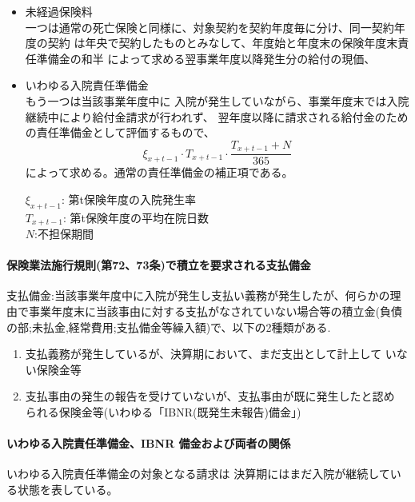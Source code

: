 \documentclass[report,gutter=10mm,fore-edge=10mm,uplatex,dvipdfmx]{jlreq}
\begin{document}
\begin{itemize}
 \item 未経過保険料\\
一つは通常の死亡保険と同様に、対象契約を契約年度毎に分け、同一契約年度の契約
は年央で契約したものとみなして、年度始と年度末の保険年度末責任準備金の和半
によって求める翌事業年度以降発生分の給付の現価、
 \item いわゆる入院責任準備金\\
もう一つは当該事業年度中に
入院が発生していながら、事業年度末では入院継続中により給付金請求が行われず、
翌年度以降に請求される給付金のための責任準備金として評価するもので、
$$\xi_{x+t-1}\cdot T_{x+t-1}\cdot\frac{T_{x+t-1}+N}{365}$$
によって求める。通常の責任準備金の補正項である。

$\xi_{x+t-1}$: 第t保険年度の入院発生率\\
$T_{x+t-1}$: 第t保険年度の平均在院日数\\
$N$:不担保期間
\end{itemize}

\paragraph{保険業法施行規則(第72、73条)で積立を要求される支払備金}

支払備金:当該事業年度中に入院が発生し支払い義務が発生したが、何らかの理由で事業年度末に当該事由に対する支払がなされていない場合等の積立金(負債の部;未払金,経常費用;支払備金等繰入額)で、以下の2種類がある. 

\begin{enumerate}
\item 支払義務が発生しているが、決算期において、まだ支出として計上して
いない保険金等
\item 支払事由の発生の報告を受けていないが、支払事由が既に発生したと認め
られる保険金等(いわゆる「IBNR(既発生未報告)備金」)
\end{enumerate}

\paragraph{いわゆる入院責任準備金、IBNR 備金および両者の関係}

いわゆる入院責任準備金の対象となる請求は
決算期にはまだ入院が継続している状態を表している。
\end{document}
